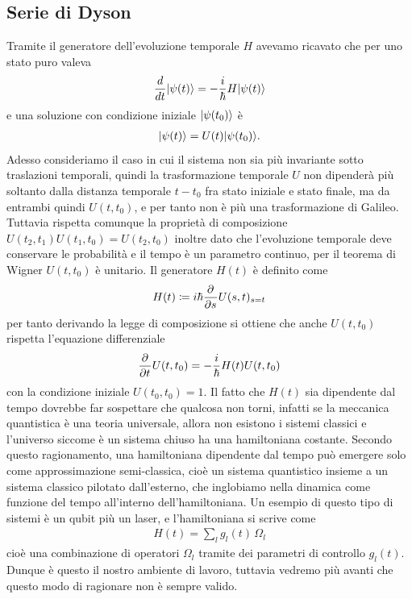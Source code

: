 \subsection{Serie di Dyson}
Tramite il generatore dell'evoluzione temporale $ H $ avevamo ricavato che per uno stato puro valeva 
\begin{align*}
  \frac{d}{dt} \vert \psi(t) \rangle = - \frac{i}{\hbar} H \vert \psi(t) \rangle
\end{align*}
e una soluzione con condizione iniziale $ \vert \psi(t_0) \rangle $ è 
\begin{align*}
  \vert \psi(t) \rangle = U(t) \vert \psi(t_0) \rangle.
\end{align*}
Adesso consideriamo il caso in cui il sistema non sia più invariante sotto traslazioni temporali, quindi la trasformazione temporale $ U $ non dipenderà
più soltanto dalla distanza temporale $ t - t_0 $ fra stato iniziale e stato finale, ma da entrambi quindi $ U(t,t_0) $, e per tanto non è 
più una trasformazione di Galileo. Tuttavia rispetta comunque la proprietà di composizione $ U(t_2, t_1)U(t_1,t_0) = U(t_2,t_0) $ 
inoltre dato che l'evoluzione temporale deve conservare le probabilità e il tempo è un parametro continuo, per il teorema di Wigner $ U(t,t_0) $ è 
unitario. 
Il generatore $ H(t) $ è definito come 
\begin{align} \label{eq: hamiltoniana dipendente dal tempo come derivata dell'evolutore temporale}
  H(t) \coloneq i \hbar \frac{\partial^{} {}}{\partial {s}^{}}U(s,t)_{s = t}
\end{align}
per tanto derivando la legge di composizione si ottiene che anche $ U(t,t_0) $ rispetta l'equazione differenziale
\begin{align} \label{eq: relazione fra H e U}
  \frac{\partial^{} {}}{\partial {t}^{}} U(t,t_0) = -\frac{i}{\hbar} H(t) U(t,t_0) 
\end{align}
con la condizione iniziale $ U(t_0,t_0) = 1 $. Il fatto che $ H(t) $ sia dipendente dal tempo dovrebbe far sospettare che qualcosa non torni, infatti 
se la meccanica quantistica è una teoria universale, allora non esistono i sistemi classici e l'universo siccome è un sistema chiuso ha una hamiltoniana 
costante. Secondo questo ragionamento, una hamiltoniana dipendente dal tempo può emergere solo come approssimazione semi-classica, cioè un sistema 
quantistico insieme a un sistema classico pilotato dall'esterno, che inglobiamo nella dinamica come funzione del tempo all'interno dell'hamiltoniana.
Un esempio di questo tipo di sistemi è un qubit più un laser, e l'hamiltoniana si scrive come 
\begin{align*}
  H(t) = \sum_l g_l(t) \, \Omega_l
\end{align*}
cioè una combinazione di operatori $ \Omega_l $ tramite dei parametri di controllo $ g_l(t) $. 
Dunque è questo il nostro ambiente di lavoro, tuttavia vedremo più avanti che questo modo di ragionare non è sempre valido.

